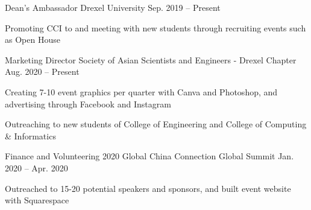 
\begin{cvhonors}

  \cvhonor
  {Dean's Ambassador} %
  {Drexel University} %
  {Sep. 2019 -- Present} %
  {
    \begin{cvitems}
      \item{Promoting CCI to and meeting with new students through recruiting events such as Open House}
    \end{cvitems}
  } %

  \cvhonor
  {Marketing Director} %
  {Society of Asian Scientists and Engineers - Drexel Chapter} %
  {Aug. 2020 -- Present} %
  {
    \begin{cvitems}
      \item {Creating 7-10 event graphics per quarter with Canva and Photoshop, and advertising through Facebook and Instagram}
      \item {Outreaching to new students of College of Engineering and College of Computing \& Informatics}
    \end{cvitems}
  } %

  \cvhonor
  {Finance and Volunteering} %
  {2020 Global China Connection Global Summit} %
  {Jan. 2020 -- Apr. 2020} %
  {
    \begin{cvitems}
      \item{Outreached to 15-20 potential speakers and sponsors, and built event website with Squarespace}
    \end{cvitems}
  } %

\end{cvhonors}
